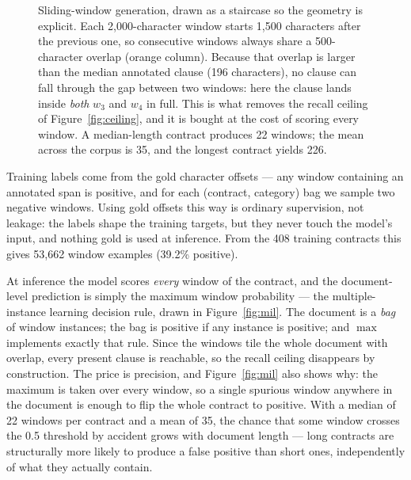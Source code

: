 \begin{figure}[ht]
\caption{Sliding-window generation, drawn as a staircase so the geometry is explicit. Each 2{,}000-character window starts 1{,}500 characters after the previous one, so consecutive windows always share a 500-character overlap (orange column). Because that overlap is larger than the median annotated clause (196 characters), no clause can fall through the gap between two windows: here the clause lands inside \emph{both} $w_3$ and $w_4$ in full. This is what removes the recall ceiling of Figure~\ref{fig:ceiling}, and it is bought at the cost of scoring every window. A median-length contract produces 22 windows; the mean across the corpus is 35, and the longest contract yields 226.}
\label{fig:windows}
\end{figure}

Training labels come from the gold character offsets --- any window containing an annotated span is positive, and for each (contract, category) bag we sample two negative windows. Using gold offsets this way is ordinary supervision, not leakage: the labels shape the training targets, but they never touch the model's input, and nothing gold is used at inference. From the 408 training contracts this gives 53{,}662 window examples (39.2\% positive).

At inference the model scores \emph{every} window of the contract, and the document-level prediction is simply the maximum window probability --- the multiple-instance learning decision rule, drawn in Figure~\ref{fig:mil}. The document is a \emph{bag} of window instances; the bag is positive if any instance is positive; and $\max$ implements exactly that rule. Since the windows tile the whole document with overlap, every present clause is reachable, so the recall ceiling disappears by construction. The price is precision, and Figure~\ref{fig:mil} also shows why: the maximum is taken over every window, so a single spurious window anywhere in the document is enough to flip the whole contract to positive. With a median of 22 windows per contract and a mean of 35, the chance that some window crosses the 0.5 threshold by accident grows with document length --- long contracts are structurally more likely to produce a false positive than short ones, independently of what they actually contain.

